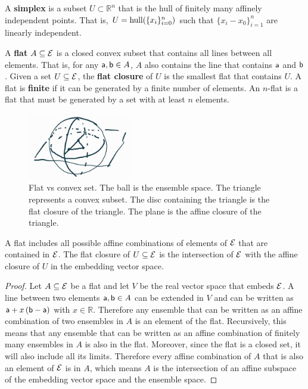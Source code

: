 \begin{mathSection}
	\begin{defn}
		A \textbf{simplex} is a subset $U \subset \mathbb{R}^n$ that is the hull of finitely many affinely independent points. That is, $U = \hull(\{x_i\}_{i=0}^{n})$ such that $\{x_i - x_0\}_{i=1}^{n}$ are linearly independent.
	\end{defn}
	
	\begin{defn}
		A \textbf{flat} $A \subseteq \Ens$ is a closed convex subset that contains all lines between all elements. That is, for any $\ens[a], \ens[b] \in A$, $A$ also contains the line that contains $\ens[a]$ and $\ens[b]$. Given a set $U \subseteq \Ens$, the \textbf{flat closure} of $U$ is the smallest flat that contains $U$. A flat is \textbf{finite} if it can be generated by a finite number of elements. An $n$-flat is a flat that must be generated by a set with at least $n$ elements.
	\end{defn}
	
	\begin{figure}[H]
		\centering
		\includegraphics[width=0.4\textwidth]{tempimages/FlatVsConvex.jpg}
		\caption{Flat vs convex set. The ball is the ensemble space. The triangle represents a convex subset. The disc containing the triangle is the flat closure of the triangle. The plane is the affine closure of the triangle.}
	\end{figure}
	
	
	\begin{prop}
		A flat includes all possible affine combinations of elements of $\Ens$ that are contained in $\Ens$. The flat closure of $U \subseteq \Ens$ is the intersection of $\Ens$ with the affine closure of $U$ in the embedding vector space.
	\end{prop}
	
	\begin{proof}
		Let $A \subseteq \Ens$ be a flat and let $V$ be the real vector space that embeds $\Ens$. A line between two elements $\ens[a], \ens[b] \in A$ can be extended in $V$ and can be written as $\ens[a] + x \left(\ens[b] - \ens[a]\right)$ with $x \in \mathbb{R}$. Therefore any ensemble that can be written as an affine combination of two ensembles in $A$ is an element of the flat. Recursively, this means that any ensemble that can be written as an affine combination of finitely many ensembles in $A$ is also in the flat. Moreover, since the flat is a closed set, it will also include all its limits. Therefore every affine combination of $A$ that is also an element of $\Ens$ is in $A$, which means $A$ is the intersection of an affine subspace of the embedding vector space and the ensemble space.
		

\end{proof}
\end{mathSection}
